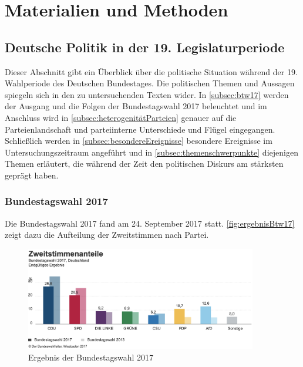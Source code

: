 
\chapter{Materialien und Methoden} \label{ch:materialsAndMethods}



\section{Deutsche Politik in der 19. Legislaturperiode}

Dieser Abschnitt gibt ein Überblick über die politische Situation während der \num{19}. Wahlperiode des Deutschen Bundestages. Die politischen Themen und Aussagen spiegeln sich in den zu untersuchenden Texten wider. In \autoref{subsec:btw17} werden der Ausgang und die Folgen der Bundestagswahl \num{2017} beleuchtet und im Anschluss wird in \autoref{subsec:heterogenitätParteien} genauer auf die Parteienlandschaft und parteiinterne Unterschiede und Flügel eingegangen. Schließlich werden in \autoref{subsec:besondereEreignisse} besondere Ereignisse im Untersuchungszeitraum angeführt und in \autoref{subsec:themenschwerpunkte} diejenigen Themen erläutert, die während der Zeit den politischen Diskurs am stärksten geprägt haben.

\subsection{Bundestagswahl \num{2017}} \label{subsec:btw17}

Die Bundestagswahl \num{2017} fand am \num{24}. September \num{2017} statt. \autoref{fig:ergebnisBtw17} zeigt dazu die Aufteilung der Zweitstimmen nach Partei.

\begin{figure}[H]
    \centering
    \includegraphics[width=0.9\textwidth]{data/images/ergebnisBtw17.png}
    \caption{Ergebnis der Bundestagswahl \num{2017} \autocite{noauthor_bundestagswahl_nodate}} \label{fig:ergebnisBtw17}
\end{figure}

